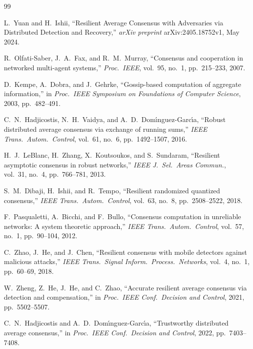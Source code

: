 \documentclass[journal]{IEEEtran}
\begin{document}
\begin{thebibliography}{99}

L.~Yuan and H.~Ishii,
``Resilient Average Consensus with Adversaries via Distributed Detection and
Recovery,'' \emph{arXiv preprint} arXiv:2405.18752v1, May 2024.

R.~Olfati-Saber, J.~A.~Fax, and R.~M.~Murray,
``Consensus and cooperation in networked multi-agent systems,''
\emph{Proc.\ IEEE}, vol.~95, no.~1, pp.~215--233, 2007.

D.~Kempe, A.~Dobra, and J.~Gehrke,
``Gossip-based computation of aggregate information,''
in \emph{Proc.\ IEEE Symposium on Foundations of Computer Science}, 2003,
pp.~482--491.

C.~N.~Hadjicostis, N.~H.~Vaidya, and A.~D.~Dom\'{\i}nguez-Garc\'{\i}a,
``Robust distributed average consensus via exchange of running sums,''
\emph{IEEE Trans.\ Autom.\ Control}, vol.~61, no.~6, pp.~1492--1507, 2016.

H.~J.~LeBlanc, H.~Zhang, X.~Koutsoukos, and S.~Sundaram,
``Resilient asymptotic consensus in robust networks,''
\emph{IEEE J.\ Sel.\ Areas Commun.}, vol.~31, no.~4, pp.~766--781, 2013.

S.~M.~Dibaji, H.~Ishii, and R.~Tempo,
``Resilient randomized quantized consensus,''
\emph{IEEE Trans.\ Autom.\ Control}, vol.~63, no.~8, pp.~2508--2522, 2018.

F.~Pasqualetti, A.~Bicchi, and F.~Bullo,
``Consensus computation in unreliable networks: A system theoretic approach,''
\emph{IEEE Trans.\ Autom.\ Control}, vol.~57, no.~1, pp.~90--104, 2012.

C.~Zhao, J.~He, and J.~Chen,
``Resilient consensus with mobile detectors against malicious attacks,''
\emph{IEEE Trans.\ Signal Inform.\ Process.\ Networks}, vol.~4, no.~1,
pp.~60--69, 2018.

W.~Zheng, Z.~He, J.~He, and C.~Zhao,
``Accurate resilient average consensus via detection and compensation,''
in \emph{Proc.\ IEEE Conf.\ Decision and Control}, 2021, pp.~5502--5507.

C.~N.~Hadjicostis and A.~D.~Dom\'{\i}nguez-Garc\'{\i}a,
``Trustworthy distributed average consensus,''
in \emph{Proc.\ IEEE Conf.\ Decision and Control}, 2022, pp.~7403--7408.


\end{thebibliography}
\end{document}
